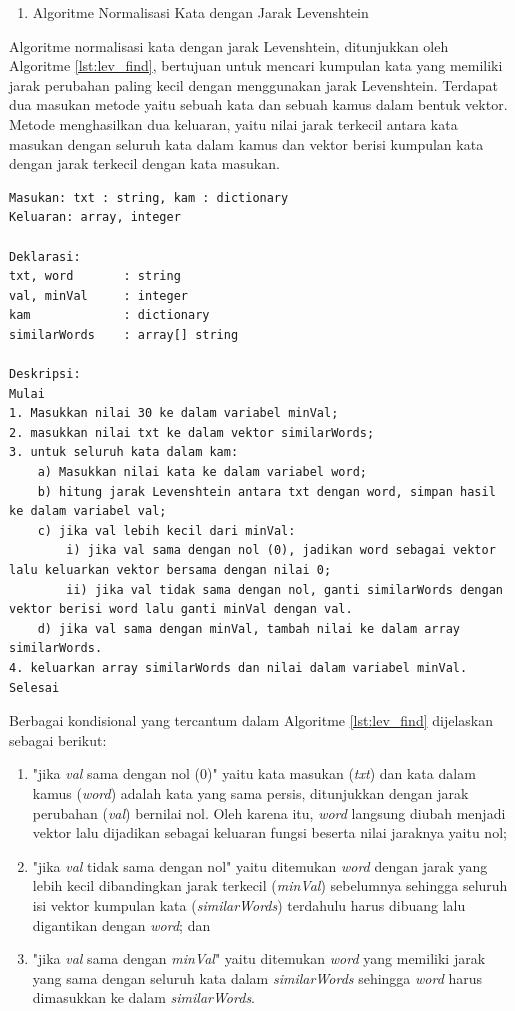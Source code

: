 \begin{enumerate}[label=\textit{\Alph*)}, itemindent=*, series=process_list]
	\item Algoritme Normalisasi Kata dengan Jarak Levenshtein
\end{enumerate}

Algoritme normalisasi kata dengan jarak Levenshtein, ditunjukkan oleh Algoritme \ref{lst:lev_find}, bertujuan untuk mencari kumpulan kata yang memiliki jarak perubahan paling kecil dengan menggunakan jarak Levenshtein. Terdapat dua masukan metode yaitu sebuah kata dan sebuah kamus dalam bentuk vektor. Metode menghasilkan dua keluaran, yaitu nilai jarak terkecil antara kata masukan dengan seluruh kata dalam kamus dan vektor berisi kumpulan kata dengan jarak terkecil dengan kata masukan.
\begin{lstlisting}[caption={Algoritme Fungsi Normalisasi Kata dengan Jarak Levenshtein},label={lst:lev_find},float=ht]
Masukan: txt : string, kam : dictionary
Keluaran: array, integer

Deklarasi:
txt, word		: string
val, minVal 	: integer
kam				: dictionary
similarWords	: array[] string

Deskripsi:
Mulai
1. Masukkan nilai 30 ke dalam variabel minVal;
2. masukkan nilai txt ke dalam vektor similarWords;
3. untuk seluruh kata dalam kam:
	a) Masukkan nilai kata ke dalam variabel word;
	b) hitung jarak Levenshtein antara txt dengan word, simpan hasil ke dalam variabel val;
	c) jika val lebih kecil dari minVal:
		i) jika val sama dengan nol (0), jadikan word sebagai vektor lalu keluarkan vektor bersama dengan nilai 0;
		ii) jika val tidak sama dengan nol, ganti similarWords dengan vektor berisi word lalu ganti minVal dengan val.
	d) jika val sama dengan minVal, tambah nilai ke dalam array similarWords.
4. keluarkan array similarWords dan nilai dalam variabel minVal.
Selesai
\end{lstlisting}

Berbagai kondisional yang tercantum dalam Algoritme \ref{lst:lev_find} dijelaskan sebagai berikut:
\begin{enumerate}
	\item "jika \textit{val} sama dengan nol (0)" yaitu kata masukan (\textit{txt}) dan kata dalam kamus (\textit{word}) adalah kata yang sama persis, ditunjukkan dengan jarak perubahan (\textit{val}) bernilai nol. Oleh karena itu, \textit{word} langsung diubah menjadi vektor lalu dijadikan sebagai keluaran fungsi beserta nilai jaraknya yaitu nol;
	\item "jika \textit{val} tidak sama dengan nol" yaitu ditemukan \textit{word} dengan jarak yang lebih kecil dibandingkan jarak terkecil (\textit{minVal}) sebelumnya sehingga seluruh isi vektor kumpulan kata (\textit{similarWords}) terdahulu harus dibuang lalu digantikan dengan \textit{word}; dan
	\item "jika \textit{val} sama dengan \textit{minVal}" yaitu ditemukan \textit{word} yang memiliki jarak yang sama dengan seluruh kata dalam \textit{similarWords} sehingga \textit{word} harus dimasukkan ke dalam \textit{similarWords}.
\end{enumerate}

